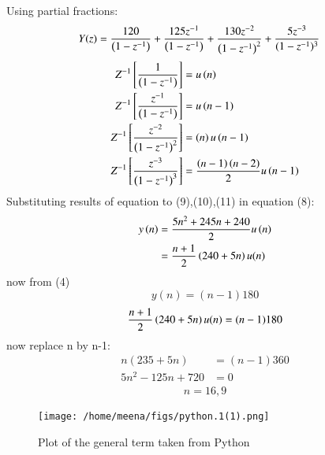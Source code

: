 \documentclass[journal,12pt,twocolumn]{IEEEtran}
\theoremstyle{remark}
\begin{document}
Using partial fractions:
\begin{align}
    Y(z) &= \frac{120}{\left(1-z^{-1}\right)}+\frac{125z^{-1}}{\left(1-z^{-1}\right)} + \frac{130z^{-2}}{\left(1-z^{-1}\right)^2} + \frac{5z^{-3}}{(1-z^{-1})^3}
\end{align}
\begin{align}
Z^{-1}\left[\frac{1}{\left(1-z^{-1}\right)}\right]&=u\left(n\right) \\
Z^{-1}\left[\frac{z^{-1}}{\left(1-z^{-1}\right)}\right]&=u\left(n-1\right) \\
    Z^{-1}\left[\frac{z^{-2}}{\left(1-z^{-1}\right)^2}\right]&=\left(n\right)u\left(n-1\right) \\
     Z^{-1}\left[\frac{z^{-3}}{\left(1-z^{-1}\right)^3}\right]&=\frac{\left(n-1\right)\left(n-2\right)}{2}u\left(n-1\right)
\end{align}
Substituting results of equation to (9),(10),(11) in equation (8):
\begin{align}
    y\left(n\right) &= \frac{5n^2+245n+240}{2}u\left(n\right)\\
    &=\frac{n+1}{2}\left(240+5n\right)u(n)
\end{align}
now from (4) 
\begin{equation}
    y(n)=(n-1)180
\end{equation}
\begin{align}
    \frac{n+1}{2}\left(240+5n\right)u(n)=(n-1)180\\ 
\end{align}
now replace n by n-1: 
\begin{align}
    n(235+5n)&=(n-1)360\\
    5n^2-125n+720&=0
\end{align}
\begin{align}
   n=16,9
\end{align}
\begin{figure}[h]
  \centering
  \texttt{[image: /home/meena/figs/python.1(1).png]} 
  \captionsetup{justification=centering}
  \caption{Plot of the general term taken from Python}
  \label{fig:your_label}
\end{figure}
\end{document}
